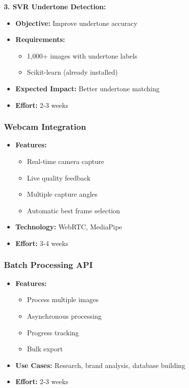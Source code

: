 \textbf{3. SVR Undertone Detection:}
\begin{itemize}
    \item \textbf{Objective:} Improve undertone accuracy
    \item \textbf{Requirements:}
    \begin{itemize}
        \item 1,000+ images with undertone labels
        \item Scikit-learn (already installed)
    \end{itemize}
    \item \textbf{Expected Impact:} Better undertone matching
    \item \textbf{Effort:} 2-3 weeks
\end{itemize}

\subsubsection{Webcam Integration}

\begin{itemize}
    \item \textbf{Features:}
    \begin{itemize}
        \item Real-time camera capture
        \item Live quality feedback
        \item Multiple capture angles
        \item Automatic best frame selection
    \end{itemize}
    \item \textbf{Technology:} WebRTC, MediaPipe
    \item \textbf{Effort:} 3-4 weeks
\end{itemize}

\subsubsection{Batch Processing API}

\begin{itemize}
    \item \textbf{Features:}
    \begin{itemize}
        \item Process multiple images
        \item Asynchronous processing
        \item Progress tracking
        \item Bulk export
    \end{itemize}
    \item \textbf{Use Cases:} Research, brand analysis, database building
    \item \textbf{Effort:} 2-3 weeks
\end{itemize}

